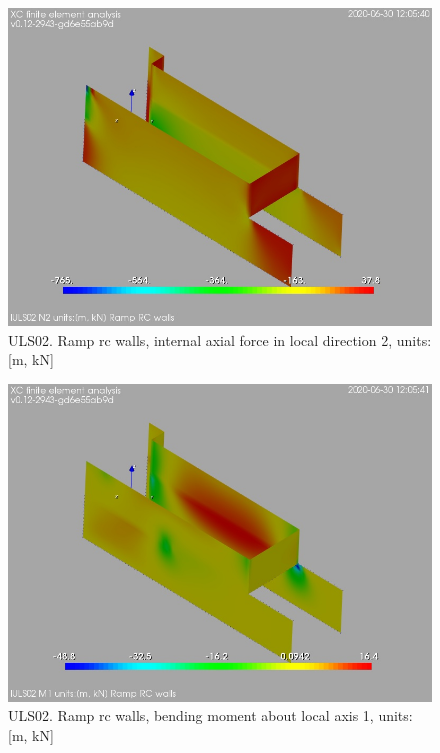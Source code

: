 \begin{figure}
\begin{center}
\includegraphics[width=\linewidth]{ramp_wall/resLC/text/graphics/resSimplLC/lULS02wallsN2}
\caption{ULS02. Ramp rc walls, internal axial force in local direction 2, units:[m, kN]}
\end{center}
\end{figure}
\begin{figure}
\begin{center}
\includegraphics[width=\linewidth]{ramp_wall/resLC/text/graphics/resSimplLC/lULS02wallsM1}
\caption{ULS02. Ramp rc walls, bending moment about local axis 1, units:[m, kN]}
\end{center}
\end{figure}
